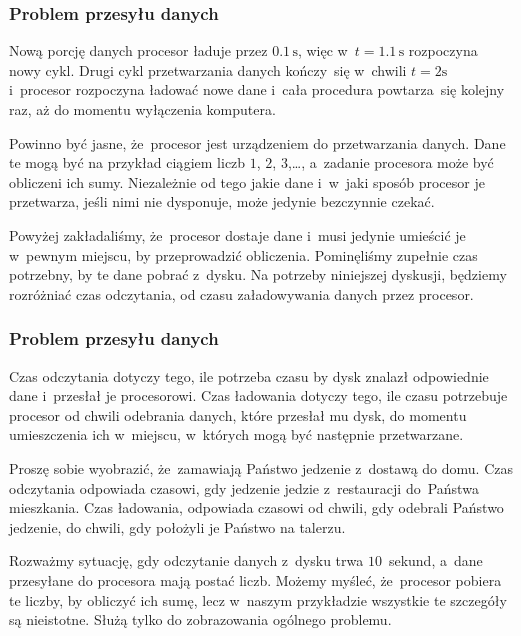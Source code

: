 \documentclass[10pt,t]{beamer}
\begin{document}
\begin{frame}
  \frametitle{Problem przesyłu danych}


  Nową porcję danych procesor ładuje przez $0.1 \, \text{s}$, więc
  w~$t = 1.1 \, \text{s}$ rozpoczyna nowy cykl.  Drugi cykl przetwarzania
  danych kończy~się w~chwili $t = 2 \text{s}$ i~procesor rozpoczyna ładować
  nowe dane i~cała procedura powtarza~się kolejny raz, aż do momentu
  wyłączenia komputera.

  Powinno być jasne, że~procesor jest urządzeniem do przetwarzania danych.
  Dane te mogą być na przykład ciągiem liczb $1$, $2$, $3$,\ldots, a~zadanie
  procesora może być obliczeni ich sumy. Niezależnie od tego jakie dane
  i~w~jaki sposób procesor je przetwarza, jeśli nimi nie dysponuje, może
  jedynie bezczynnie czekać.

  Powyżej zakładaliśmy, że~procesor dostaje dane i~musi jedynie umieścić
  je w~pewnym miejscu, by przeprowadzić obliczenia. Pominęliśmy zupełnie
  czas potrzebny, by te dane pobrać z~dysku. Na potrzeby niniejszej
  dyskusji, będziemy rozróżniać czas odczytania, od czasu załadowywania
  danych przez procesor.

\end{frame}





\begin{frame}
  \frametitle{Problem przesyłu danych}


  Czas odczytania dotyczy tego, ile potrzeba czasu by dysk znalazł
  odpowiednie dane i~przesłał je procesorowi. Czas ładowania dotyczy tego,
  ile czasu potrzebuje procesor od chwili odebrania danych, które przesłał
  mu dysk, do momentu umieszczenia ich w~miejscu, w~których mogą być
  następnie przetwarzane.

  Proszę sobie wyobrazić, że~zamawiają Państwo jedzenie z~dostawą do domu.
  Czas odczytania odpowiada czasowi, gdy jedzenie jedzie z~restauracji
  do~Państwa mieszkania. Czas ładowania, odpowiada czasowi od chwili, gdy
  odebrali Państwo jedzenie, do chwili, gdy położyli je Państwo na talerzu.

  Rozważmy sytuację, gdy odczytanie danych z~dysku trwa $10$~sekund, a~dane
  przesyłane do procesora mają postać liczb. Możemy myśleć, że~procesor
  pobiera te liczby, by obliczyć ich sumę, lecz w~naszym przykładzie
  wszystkie te szczegóły są nieistotne. Służą tylko do zobrazowania
  ogólnego problemu.

\end{frame}
\end{document}
